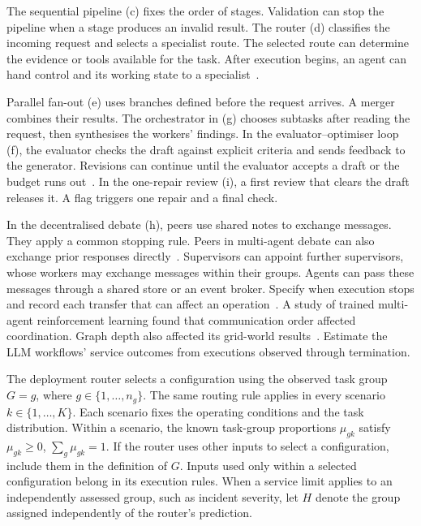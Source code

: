 \documentclass[11pt,reqno]{amsart}
\theoremstyle{definition}
\theoremstyle{remark}
\begin{document}
The sequential pipeline (c) fixes the order of stages. Validation can stop the pipeline when a stage produces an invalid result. The router (d) classifies the incoming request and selects a specialist route. The selected route can determine the evidence or tools available for the task. After execution begins, an agent can hand control and its working state to a specialist~\cite{runkleArchitectures2026}.

Parallel fan-out (e) uses branches defined before the request arrives. A merger combines their results. The orchestrator in (g) chooses subtasks after reading the request, then synthesises the workers' findings. In the evaluator--optimiser loop (f), the evaluator checks the draft against explicit criteria and sends feedback to the generator. Revisions can continue until the evaluator accepts a draft or the budget runs out~\cite{anthropicEffectiveAgents2024}. In the one-repair review (i), a first review that clears the draft releases it. A flag triggers one repair and a final check.

In the decentralised debate (h), peers use shared notes to exchange messages. They apply a common stopping rule. Peers in multi-agent debate can also exchange prior responses directly~\cite{duDebate2024}. Supervisors can appoint further supervisors, whose workers may exchange messages within their groups. Agents can pass these messages through a shared store or an event broker. Specify when execution stops and record each transfer that can affect an operation~\cite{agentPatternsTopology,huangTopologies2026}.
A study of trained multi-agent reinforcement learning found that communication order affected coordination. Graph depth also affected its grid-world results~\cite{zhangMarlTopology2025}.
Estimate the LLM workflows' service outcomes from executions observed through termination.

The deployment router selects a configuration using the observed task group $G=g$, where $g\in\{1,\ldots,n_g\}$.
The same routing rule applies in every scenario $k\in\{1,\ldots,K\}$. Each scenario fixes the operating conditions and the task distribution.
Within a scenario, the known task-group proportions $\mu_{gk}$ satisfy $\mu_{gk}\ge0$, $\sum_g\mu_{gk}=1$.
If the router uses other inputs to select a configuration, include them in the definition of $G$. Inputs used only within a selected configuration belong in its execution rules.
When a service limit applies to an independently assessed group, such as incident severity, let $H$ denote the group assigned independently of the router's prediction.
\end{document}
